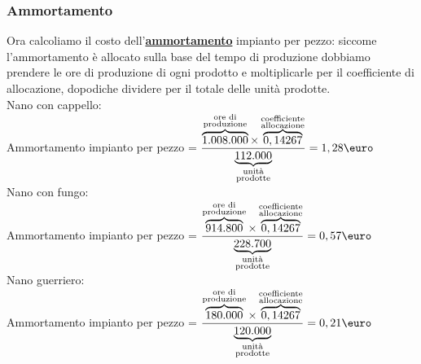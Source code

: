\documentclass{article}
\begin{document}
\subsubsection*{Ammortamento}
Ora calcoliamo il costo dell'\textbf{\underline{ammortamento}} impianto per pezzo: siccome l'ammortamento è allocato sulla base del tempo di produzione dobbiamo prendere le ore di produzione di ogni prodotto e moltiplicarle per il coefficiente di allocazione, dopodiche dividere per il totale delle unità prodotte.
\vspace*{0.1cm}\\
Nano con cappello:\\
Ammortamento impianto per pezzo = $ \dfrac{\overbrace{1.008.000}^{\substack{\text{ore di} \\ \text{produzione}}} \times \overbrace{0,14267}^{\substack{\text{coefficiente} \\ \text{allocazione}}}}{\underbrace{112.000}_{\substack{\text{unità} \\ \text{prodotte}}}}=1,28\T{\euro} $
\vspace*{0.1cm}\\
Nano con fungo:\\
Ammortamento impianto per pezzo = $ \dfrac{\overbrace{914.800}^{\substack{\text{ore di} \\ \text{produzione}}} \times \overbrace{0,14267}^{\substack{\text{coefficiente} \\ \text{allocazione}}}}{\underbrace{228.700}_{\substack{\text{unità} \\ \text{prodotte}}}}=0,57\T{\euro} $
\vspace*{0.1cm}\\
Nano guerriero:\\
Ammortamento impianto per pezzo = $ \dfrac{\overbrace{180.000}^{\substack{\text{ore di} \\ \text{produzione}}} \times \overbrace{0,14267}^{\substack{\text{coefficiente} \\ \text{allocazione}}}}{\underbrace{120.000}_{\substack{\text{unità} \\ \text{prodotte}}}}=0,21\T{\euro} $
\end{document}
